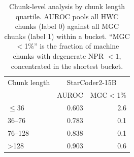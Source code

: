 \begin{table}[t]
\centering
\caption{Chunk-level analysis by chunk length quartile. AUROC pools all HWC chunks (label 0) against all MGC chunks (label 1) within a bucket. ``MGC$<$1\%'' is the fraction of machine chunks with degenerate NPR $<1$, concentrated in the shortest bucket.}
\label{tab:chunk-by-length}
\begin{tabular}{lrr}
\toprule
Chunk length & \multicolumn{2}{c}{StarCoder2-15B} \\
 & AUROC & MGC$<$1\% \\
\midrule
$\leq$36 & 0.603 & 2.6 \\
36--76 & 0.783 & 0.1 \\
76--128 & 0.838 & 0.1 \\
>128 & 0.903 & 0.6 \\
\bottomrule
\end{tabular}
\end{table}
